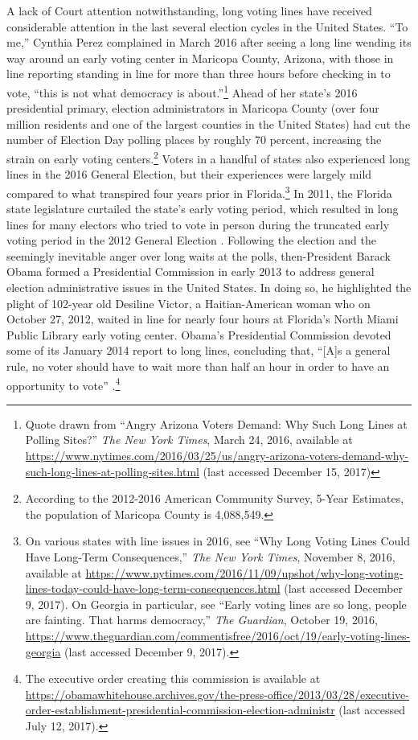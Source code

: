 \documentclass[12pt,titlepage]{article}
\begin{document}
A lack of Court attention notwithstanding, long voting lines have
received considerable attention in the last several election cycles in
the United States.  ``To me,'' Cynthia Perez complained in March 2016
after seeing a long line wending its way around an early voting center
in Maricopa County, Arizona, with those in line reporting standing in
line for more than three hours before checking in to vote, ``this is
not what democracy is about.''\footnote{Quote drawn from ``Angry
  Arizona Voters Demand: Why Such Long Lines at Polling Sites?''
  \emph{The New York Times}, March 24, 2016, available at
  \url{https://www.nytimes.com/2016/03/25/us/angry-arizona-voters-demand-why-such-long-lines-at-polling-sites.html}
  (last accessed December 15, 2017)} Ahead of her state's 2016
presidential primary, election administrators in Maricopa County (over
four million residents and one of the largest counties in the United
States) had cut the number of Election Day polling places by roughly
70 percent, increasing the strain on early voting
centers.\footnote{According to the 2012-2016 American Community
  Survey, 5-Year Estimates, the population of Maricopa County is
  4,088,549.}  Voters in a handful of states also experienced long
lines in the 2016 General Election, but their experiences were largely
mild compared to what transpired four years prior in
Florida.\footnote{On various states with line issues in 2016, see
  ``Why Long Voting Lines Could Have Long-Term Consequences,''
  \emph{The New York Times}, November 8, 2016, available at
  \url{https://www.nytimes.com/2016/11/09/upshot/why-long-voting-lines-today-could-have-long-term-consequences.html}
  (last accessed December 9, 2017).  On Georgia in particular, see
  ``Early voting lines are so long, people are fainting. That harms
  democracy,'' \emph{The Guardian}, October 19, 2016,
  \url{https://www.theguardian.com/commentisfree/2016/oct/19/early-voting-lines-georgia}
  (last accessed December 9, 2017).}  In 2011, the Florida state
legislature curtailed the state's early voting period, which resulted
in long lines for many electors who tried to vote in person during the
truncated early voting period in the 2012 General Election
\citep{herron_smith2014}.  Following the election and the seemingly
inevitable anger over long waits at the polls, then-President Barack
Obama formed a Presidential Commission in early 2013 to address
general election administrative issues in the United States.  In doing
so, he highlighted the plight of 102-year old Desiline Victor, a
Haitian-American woman who on October 27, 2012, waited in line for
nearly four hours at Florida's North Miami Public Library early voting
center.  Obama's Presidential Commission devoted some of its January
2014 report to long lines, concluding that, ``[A]s a general rule, no
voter should have to wait more than half an hour in order to have an
opportunity to vote'' \citep[p.\ 13,][]{pcea:2014}.\footnote{The
  executive order creating this commission is available at
  \url{https://obamawhitehouse.archives.gov/the-press-office/2013/03/28/executive-order-establishment-presidential-commission-election-administr}
  (last accessed July 12, 2017).}
\end{document}
